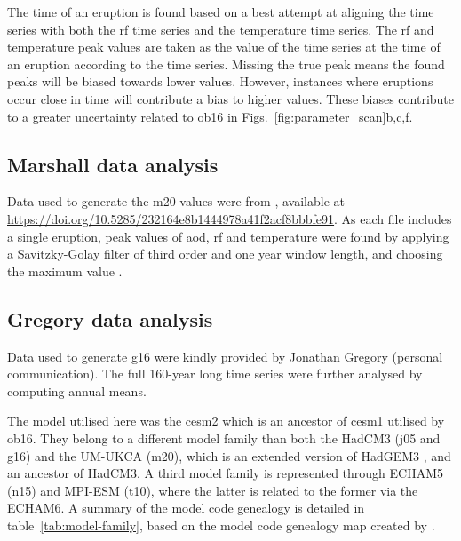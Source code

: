 \documentclass{ametsocV6.1}
\begin{document}
The time of an eruption is found based on a best attempt at aligning the  time
series with both the \gls{rf} time series and the temperature time series. The \gls{rf}
and temperature peak values are taken as the value of the time series at the time of an
eruption according to the  time series. Missing the true peak means the found
peaks will be biased towards lower values. However, instances where eruptions occur
close in time will contribute a bias to higher values. These biases contribute to a
greater uncertainty related to \gls{ob16} in Figs.~\ref{fig:parameter_scan}b,c,f.

\subsection{Marshall data analysis}\label{ap:m20}

Data used to generate the \gls{m20} values were from \citet{marshall2020dataset},
available at \url{https://doi.org/10.5285/232164e8b1444978a41f2acf8bbbfe91}. As each
file includes a single eruption, peak values of \gls{aod}, \gls{rf} and temperature were
found by applying a Savitzky-Golay filter of third order and one year window length, and
choosing the maximum value \citep{savitzky1964}.

\subsection{Gregory data analysis}\label{ap:g16}

Data used to generate \gls{g16} were kindly provided by Jonathan Gregory (personal
communication). The full 160-year long time series were further analysed by computing
annual means.

\appendix[C]


The model utilised here was the \gls{cesm2} which is an ancestor of \gls{cesm1} utilised
by \gls{ob16}. They belong to a different model family than both the HadCM3 (\gls{j05}
and \gls{g16}) and the UM-UKCA (\gls{m20}), which is an extended version of HadGEM3
\citep{dhomse2014}, and an ancestor of HadCM3. A third model family is represented
through ECHAM5 (\gls{n15}) and MPI-ESM (\gls{t10}), where the latter is related to the
former via the ECHAM6. A summary of the model code genealogy is detailed in
table~\ref{tab:model-family}, based on the model code genealogy map created by
\citet{kuma2023}.
\end{document}
